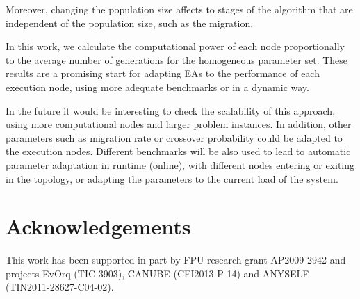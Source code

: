 \documentclass[final,1p,times]{elsarticle}
\begin{document}

Moreover, changing the population size affects to stages
of the algorithm that are independent of the population size, such as
the migration. 

In this work, we calculate the computational power of each node proportionally 
to the average number of generations for the homogeneous parameter set. These results are a promising start for adapting EAs to the
performance of each execution node, using more adequate benchmarks or in a dynamic way. 

In the future it would be interesting to check the scalability of this
approach, using more computational nodes and larger problem
instances. In addition, other parameters such as migration rate or
crossover probability could be adapted to the execution
nodes. Different benchmarks will be also used to lead to automatic
parameter adaptation in runtime (online), with different nodes entering or
exiting in the topology, or adapting the parameters to the current load of the
system. 

\section*{Acknowledgements}
This work has been supported in part by FPU research grant AP2009-2942 and projects EvOrq (TIC-3903), CANUBE (CEI2013-P-14) and ANYSELF (TIN2011-28627-C04-02).


\end{document}
